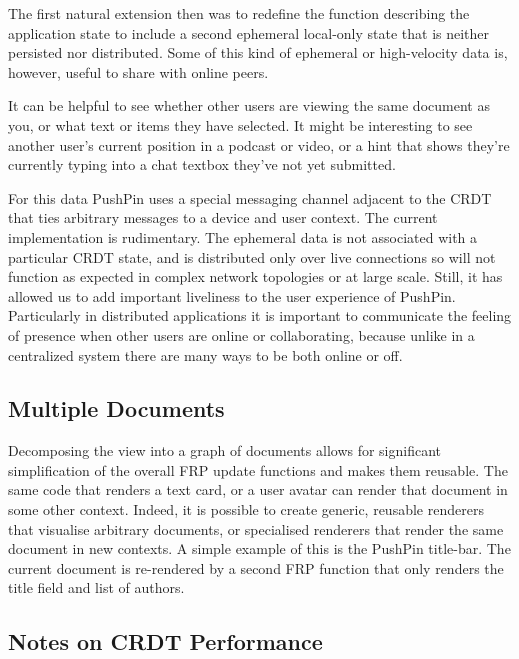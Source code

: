 \documentclass[sigplan,10pt]{acmart}
\begin{document}
The first natural extension then was to redefine the function describing the application state to include a second ephemeral local-only state that is neither persisted nor distributed. Some of this kind of ephemeral or high-velocity data is, however, useful to share with online peers.

It can be helpful to see whether other users are viewing the same document as you, or what text or items they have selected. It might be interesting to see another user's current position in a podcast or video, or a hint that shows they're currently typing into a chat textbox they've not yet submitted.

For this data PushPin uses a special messaging channel adjacent to the CRDT that ties arbitrary messages to a device and user context. The current implementation is rudimentary. The ephemeral data is not associated with a particular CRDT state, and is distributed only over live connections so will not function as expected in complex network topologies or at large scale. Still, it has allowed us to add important liveliness to the user experience of PushPin. Particularly in distributed applications it is important to communicate the feeling of presence when other users are online or collaborating, because unlike in a centralized system there are many ways to be both online or off.

\subsection{Multiple Documents}

Decomposing the view into a graph of documents allows for significant simplification of the overall FRP update functions and makes them reusable. The same code that renders a text card, or a user avatar can render that document in some other context. Indeed, it is possible to create generic, reusable renderers that visualise arbitrary documents, or specialised renderers that render the same document in new contexts. A simple example of this is the PushPin title-bar. The current document is re-rendered by a second FRP function that only renders the title field and list of authors. 


\subsection{Notes on CRDT Performance}
\end{document}
